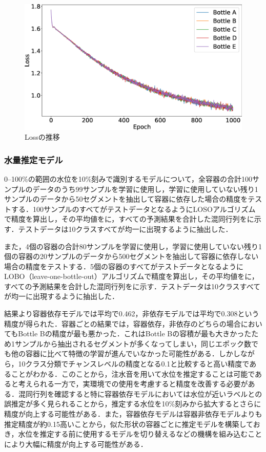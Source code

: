 \documentclass[submit,techrep,noauthor]{ipsj}
\begin{document}
\begin{figure}[!t]
  \centering
  \includegraphics[width=1\linewidth]{figures/loss_5.eps}
  \caption{Lossの推移}
  \label{fig:loss}
\end{figure}

\subsubsection{水量推定モデル}
0--100\%の範囲の水位を10\%刻みで識別するモデルについて，全容器の合計100サンプルのデータのうち99サンプルを学習に使用し，学習に使用していない残り1サンプルのデータから50セグメントを抽出して容器に依存した場合の精度をテストする．100サンプルのすべてがテストデータとなるようにLOSOアルゴリズムで精度を算出し，その平均値をに，すべての予測結果を合計した混同行列をに示す．テストデータは10クラスすべてが均一に出現するように抽出した．\par

また，4個の容器の合計80サンプルを学習に使用し，学習に使用していない残り1個の容器の20サンプルのデータから500セグメントを抽出して容器に依存しない場合の精度をテストする．5個の容器のすべてがテストデータとなるようにLOBO（leave-one-bottle-out）アルゴリズムで精度を算出し，その平均値をに，すべての予測結果を合計した混同行列をに示す．テストデータは10クラスすべてが均一に出現するように抽出した．\par

結果より容器依存モデルでは平均で0.462，非依存モデルでは平均で0.308という精度が得られた．容器ごとの結果では，容器依存，非依存のどちらの場合においてもBottle Bの精度が最も悪かった．これはBottle Bの容積が最も大きかったため1サンプルから抽出されるセグメントが多くなってしまい，同じエポック数でも他の容器に比べて特徴の学習が進んでいなかった可能性がある．しかしながら，10クラス分類でチャンスレベルの精度となる0.1と比較すると高い精度であることがわかる．このことから，注水音を用いて水位を推定することは可能であると考えられる一方で，実環境での使用を考慮すると精度を改善する必要がある．混同行列を確認すると特に容器依存モデルにおいては水位が近いラベルとの誤推定が多く見られることから，推定する水位を10\%刻みから拡大するとさらに精度が向上する可能性がある．また，容器依存モデルは容器非依存モデルよりも推定精度が約0.15高いことから，似た形状の容器ごとに推定モデルを構築しておき，水位を推定する前に使用するモデルを切り替えるなどの機構を組み込むことにより大幅に精度が向上する可能性がある．
\end{document}
